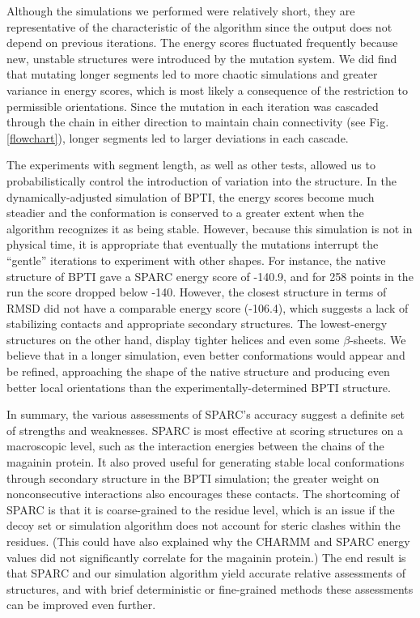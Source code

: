 \documentclass[11pt,titlepage]{article}
\begin{document}
Although the simulations we performed were relatively short, they are representative of the characteristic of the algorithm since the output does not depend on previous iterations.
The energy scores fluctuated frequently because new, unstable structures were introduced by the mutation system.
We did find that mutating longer segments led to more chaotic simulations and greater variance in energy scores, which is most likely a consequence of the restriction to permissible orientations.
Since the mutation in each iteration was cascaded through the chain in either direction to maintain chain connectivity (see Fig. \ref{flowchart}), longer segments led to larger deviations in each cascade.

The experiments with segment length, as well as other tests, allowed us to probabilistically control the introduction of variation into the structure.
In the dynamically-adjusted simulation of BPTI, the energy scores become much steadier and the conformation is conserved to a greater extent when the algorithm recognizes it as being stable.
However, because this simulation is not in physical time, it is appropriate that eventually the mutations interrupt the ``gentle'' iterations to experiment with other shapes.
For instance, the native structure of BPTI gave a SPARC energy score of -140.9, and for 258 points in the run the score dropped below -140.
However, the closest structure in terms of RMSD did not have a comparable energy score (-106.4), which suggests a lack of stabilizing contacts and appropriate secondary structures.
The lowest-energy structures on the other hand, display tighter helices and even some $\beta$-sheets.
We believe that in a longer simulation, even better conformations would appear and be refined, approaching the shape of the native structure and producing even better local orientations than the experimentally-determined BPTI structure.

In summary, the various assessments of SPARC's accuracy suggest a definite set of strengths and weaknesses. 
SPARC is most effective at scoring structures on a macroscopic level, such as the interaction energies between the chains of the magainin protein.
It also proved useful for generating stable local conformations through secondary structure in the BPTI simulation; the greater weight on nonconsecutive interactions also encourages these contacts.
The shortcoming of SPARC is that it is coarse-grained to the residue level, which is an issue if the decoy set or simulation algorithm does not account for steric clashes within the residues.
(This could have also explained why the CHARMM and SPARC energy values did not significantly correlate for the magainin protein.)
The end result is that SPARC and our simulation algorithm yield accurate relative assessments of structures, and with brief deterministic or fine-grained methods these assessments can be improved even further.
\end{document}
